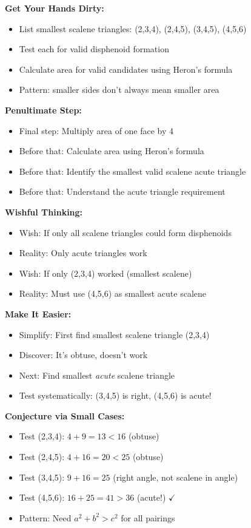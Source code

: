 \documentclass[12pt]{article}
\begin{document}
\begin{strategicbox}
\textbf{Get Your Hands Dirty:}
\begin{itemize}
    \item List smallest scalene triangles: (2,3,4), (2,4,5), (3,4,5), (4,5,6)
    \item Test each for valid disphenoid formation
    \item Calculate area for valid candidates using Heron's formula
    \item Pattern: smaller sides don't always mean smaller area
\end{itemize}

\textbf{Penultimate Step:}
\begin{itemize}
    \item Final step: Multiply area of one face by 4
    \item Before that: Calculate area using Heron's formula
    \item Before that: Identify the smallest valid scalene acute triangle
    \item Before that: Understand the acute triangle requirement
\end{itemize}

\textbf{Wishful Thinking:}
\begin{itemize}
    \item Wish: If only all scalene triangles could form disphenoids
    \item Reality: Only acute triangles work
    \item Wish: If only (2,3,4) worked (smallest scalene)
    \item Reality: Must use (4,5,6) as smallest acute scalene
\end{itemize}

\textbf{Make It Easier:}
\begin{itemize}
    \item Simplify: First find smallest scalene triangle (2,3,4)
    \item Discover: It's obtuse, doesn't work
    \item Next: Find smallest \textit{acute} scalene triangle
    \item Test systematically: (3,4,5) is right, (4,5,6) is acute!
\end{itemize}

\textbf{Conjecture via Small Cases:}
\begin{itemize}
    \item Test (2,3,4): $4 + 9 = 13 < 16$ (obtuse)
    \item Test (2,4,5): $4 + 16 = 20 < 25$ (obtuse)
    \item Test (3,4,5): $9 + 16 = 25$ (right angle, not scalene in angle)
    \item Test (4,5,6): $16 + 25 = 41 > 36$ (acute!) $\checkmark$
    \item Pattern: Need $a^2 + b^2 > c^2$ for all pairings
\end{itemize}


\end{strategicbox}
\end{document}
